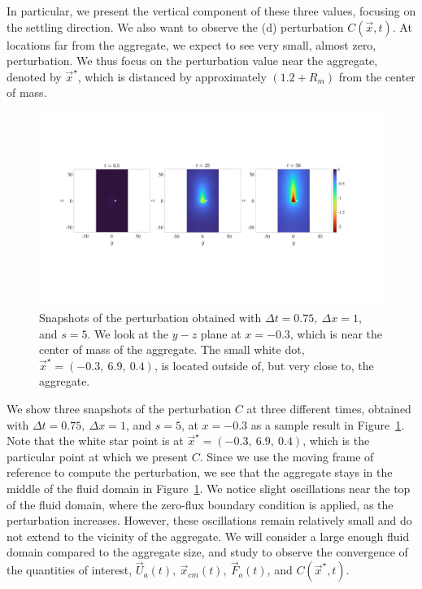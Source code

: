 In particular, we present the vertical component of these three values, focusing on the settling direction.
We also want to observe the (d) perturbation $C(\vec{x},t)$. At locations far from the aggregate, we expect to see very small, almost zero, perturbation.
We thus focus on the perturbation value near the aggregate, denoted by $\vec{x}^{\star}$, which is distanced by approximately $(1.2 + R_m)$ from the center of mass. 
\par
\begin{figure}[ht]
	\begin{center}
		\includegraphics[scale=0.26]{./figures/fig_NC10_snaps_all.pdf}
		\caption{Snapshots of the perturbation obtained with $\Delta t = 0.75, \ \Delta x = 1,$ and $s = 5$. We look at the $y-z$ plane at $x = -0.3$, which is near the center of mass of the aggregate. The small white dot, $\vec{x}^{\star} = (-0.3, \ 6.9, \ 0.4)$, is located outside of, but very close to, the aggregate.}
		\label{fig_NC10_snaps_all}
	\end{center}
\end{figure}
We show three snapshots of the perturbation $C$ at three different times, obtained with $\Delta t = 0.75, \ \Delta x = 1$, and $s = 5$, at $x = -0.3$ as a sample result in Figure~\ref{fig_NC10_snaps_all}. Note that the white star point is at ${\vec{x}^{\star}} = (-0.3, \    6.9, \      0.4)$, which is the particular point at which we present $C$. Since we use the moving frame of reference to compute the perturbation, we see that the aggregate stays in the middle of the fluid domain in Figure~\ref{fig_NC10_snaps_all}.
We notice slight oscillations near the top of the fluid domain, where the zero-flux boundary condition is applied, as the perturbation increases. 
However, these oscillations remain relatively small and do not extend to the vicinity of the aggregate. 
We will consider a large enough fluid domain compared to the aggregate size, and study to observe the convergence of the quantities of interest, $\vec{U}_a(t), \ \vec{x}_{cm} (t), \ \vec{F}_o(t)$, and $C(\vec{x}^{\star}, t)$.
